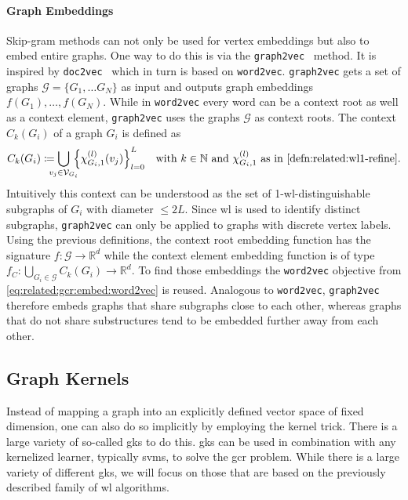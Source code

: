 \paragraph{Graph Embeddings}
Skip-gram methods can not only be used for vertex embeddings but also to embed entire graphs.
One way to do this is via the \texttt{graph2vec}~\cite{Narayanan2017} method.
It is inspired by \texttt{doc2vec}~\cite{Le2014} which in turn is based on \texttt{word2vec}.
\texttt{graph2vec} gets a set of graphs $\mathcal{G} = \{ G_1, \dots G_N \}$ as input and outputs graph embeddings $f(G_1), \dots, f(G_N)$.
While in \texttt{word2vec} every word can be a context root as well as a context element, \texttt{graph2vec} uses the graphs $\mathcal{G}$ as context roots.
The context $C_k(G_i)$ of a graph $G_i$ is defined as
\begin{equation}
	C_k(G_i) \coloneqq \bigcup_{\mathclap{v_j \in \mathcal{V}_{G_i}}}\, {\left\{ \chi_{G_i, 1}^{(l)}(v_j) \right\}}_{l = 0}^L %
	\quad\text{with $k \in \mathbb{N}$ and $\chi_{G_i, 1}^{(l)}$ as in \cref{defn:related:wl1-refine}.}
\end{equation}
Intuitively this context can be understood as the set of 1-\acs{wl}-distinguishable subgraphs of $G_i$ with diameter $\leq 2L$.
Since \ac{wl} is used to identify distinct subgraphs, \texttt{graph2vec} can only be applied to graphs with discrete vertex labels.
Using the previous definitions, the context root embedding function has the signature $f: \mathcal{G} \to \mathbb{R}^d$ while the context element embedding function is of type $f_C: \bigcup_{G_i \in \mathcal{G}} C_k(G_i) \to \mathbb{R}^d$.
To find those embeddings the \texttt{word2vec} objective from \cref{eq:related:gcr:embed:word2vec} is reused.
Analogous to \texttt{word2vec}, \texttt{graph2vec} therefore embeds graphs that share subgraphs close to each other, whereas graphs that do not share substructures tend to be embedded further away from each other.

\subsection{Graph Kernels}%
\label{sec:related:gcr:kernel}

Instead of mapping a graph into an explicitly defined vector space of fixed dimension, one can also do so implicitly by employing the kernel trick.
There is a large variety of so-called \acp{gk} to do this.
\acp{gk} can be used in combination with any kernelized learner, typically \acp{svm}, to solve the \ac{gcr} problem.
While there is a large variety of different \acp{gk}, we will focus on those that are based on the previously described family of \ac{wl} algorithms.

